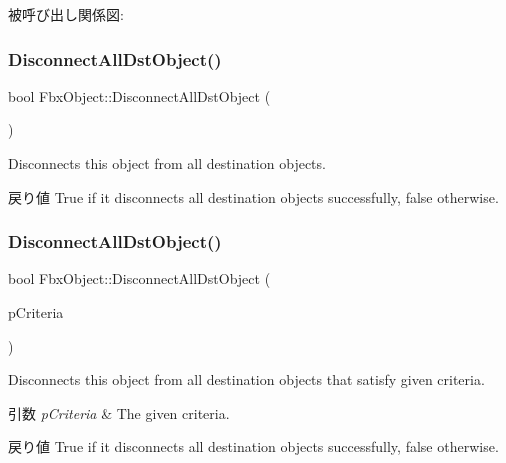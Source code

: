 被呼び出し関係図\+:
\mbox{\label{class_fbx_object_a5ebe517e8b3f221285b9754009c0660b}} 
\subsubsection{\texorpdfstring{Disconnect\+All\+Dst\+Object()}{DisconnectAllDstObject()}\hspace{0.1cm}{\footnotesize\ttfamily [1/4]}}
{\footnotesize\ttfamily bool Fbx\+Object\+::\+Disconnect\+All\+Dst\+Object (\begin{DoxyParamCaption}{ }\end{DoxyParamCaption})}

Disconnects this object from all destination objects. \begin{DoxyReturn}{戻り値}
{\ttfamily True} if it disconnects all destination objects successfully, {\ttfamily false} otherwise. 
\end{DoxyReturn}
\mbox{\label{class_fbx_object_a5668d54f53f16f5ffad95727f92a8ee6}} 
\subsubsection{\texorpdfstring{Disconnect\+All\+Dst\+Object()}{DisconnectAllDstObject()}\hspace{0.1cm}{\footnotesize\ttfamily [2/4]}}
{\footnotesize\ttfamily bool Fbx\+Object\+::\+Disconnect\+All\+Dst\+Object (\begin{DoxyParamCaption}\item[{const \hyperlink{class_fbx_criteria}{Fbx\+Criteria} \&}]{p\+Criteria }\end{DoxyParamCaption})}

Disconnects this object from all destination objects that satisfy given criteria. 
\begin{DoxyParams}{引数}
{\em p\+Criteria} & The given criteria. \\
\hline
\end{DoxyParams}
\begin{DoxyReturn}{戻り値}
{\ttfamily True} if it disconnects all destination objects successfully, {\ttfamily false} otherwise. 
\end{DoxyReturn}
\mbox{\label{class_fbx_object_aa3aab1135cdd8e63c3255e17f926d950}} 
